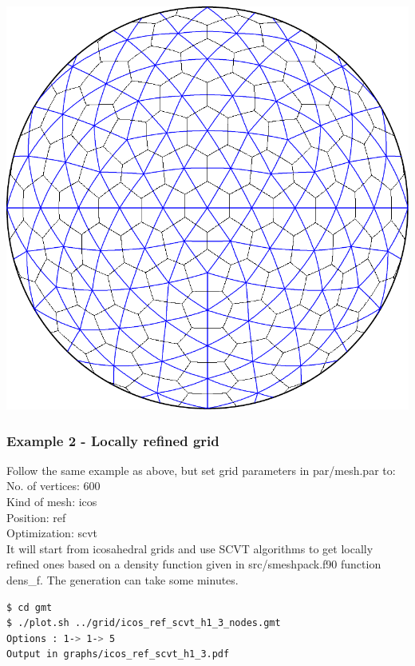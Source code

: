 \documentclass[a4paper,10pt]{article}
\begin{document}
\includegraphics[scale=0.5]{icos_pol_nopt_2}

\subsubsection{Example 2 - Locally refined grid}

Follow the same example as above, but set grid parameters in par/mesh.par to:
No. of vertices: 600 \\
Kind of mesh: icos \\
Position: ref \\
Optimization: scvt \\
It will start from icosahedral grids and use SCVT algorithms to get locally refined ones based on a density function given in src/smeshpack.f90 function dens\_f. The generation can take some minutes.

\begin{lstlisting}[language=bash]
$ cd gmt
$ ./plot.sh ../grid/icos_ref_scvt_h1_3_nodes.gmt 
Options : 1-> 1-> 5
Output in graphs/icos_ref_scvt_h1_3.pdf
\end{lstlisting}
\end{document}
